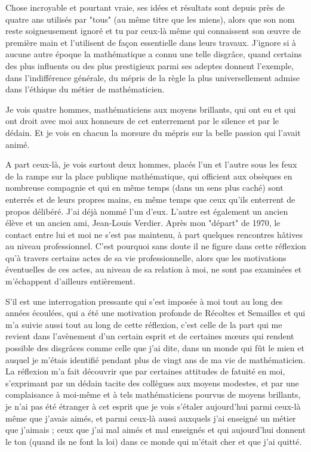 Chose incroyable et pourtant vraie, ses idées et résultats sont depuis près de quatre ans utilisés par "tous" (au même titre que les miens), alors que son nom reste soigneusement ignoré et tu par ceux-là même qui connaissent son œuvre de première main et l'utilisent de façon essentielle dans leurs travaux. J'ignore si à aucune autre époque la mathématique a connu une telle disgrâce, quand certains des plus influents ou des plus prestigieux parmi ses adeptes donnent l'exemple, dans l'indifférence générale, du mépris de la règle la plus universellement admise dans l'éthique du métier de mathématicien.

Je vois quatre hommes, mathématiciens aux moyens brillants, qui ont eu et qui ont droit avec moi aux honneurs de cet enterrement par le silence et par le dédain. Et je vois en chacun la morsure du mépris sur la belle passion qui l'avait animé.

A part ceux-là, je vois surtout deux hommes, placés l'un et l'autre sous les feux de la rampe sur la place publique mathématique, qui officient aux obsèques en nombreuse compagnie et qui en même temps (dans un sens plus caché) sont enterrés et de leurs propres mains, en même temps que ceux qu'ils enterrent de propos délibéré. J'ai déjà nommé l'un d'eux. L'autre est également un ancien élève et un ancien ami, Jean-Louis Verdier. Après mon "départ" de 1970, le contact entre lui et moi ne s'est pas maintenu, à part quelques rencontres hâtives au niveau professionnel. C'est pourquoi sans doute il ne figure dans cette réflexion qu'à travers certains actes de sa vie professionnelle, alors que les motivations éventuelles de ces actes, au niveau de sa relation à moi, ne sont pas examinées et m'échappent d'ailleurs entièrement.

S'il est une interrogation pressante qui s'est imposée à moi tout au long des années écoulées, qui a été une motivation profonde de Récoltes et Semailles et qui m'a suivie aussi tout au long de cette réflexion, c'est celle de la part qui me revient dans l'avènement d'un certain esprit et de certaines mœurs qui rendent possible des disgrâces comme celle que j'ai dite, dans un monde qui fût le mien et auquel je m'étais identifié pendant plus de vingt ans de ma vie de mathématicien. La réflexion m'a fait découvrir que par certaines attitudes de fatuité en moi, s'exprimant par un dédain tacite des collègues aux moyens modestes, et par une complaisance à moi-même et à tels mathématiciens pourvus de moyens brillants, je n'ai pas été étranger à cet esprit que je vois s'étaler aujourd'hui parmi ceux-là même que j'avais aimés, et parmi ceux-là aussi auxquels j'ai enseigné un métier que j'aimais ; ceux que j'ai mal aimés et mal enseignés et qui aujourd'hui donnent le ton (quand ils ne font la loi) dans ce monde qui m'était cher et que j'ai quitté.

